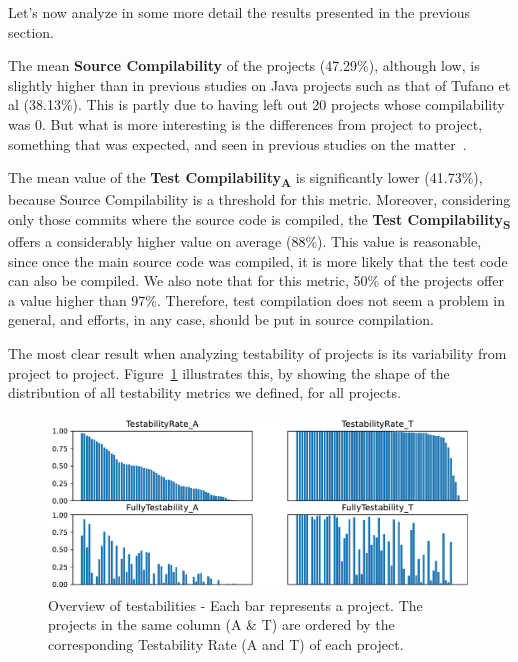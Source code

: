 Let's now analyze in some more detail the results presented in the previous section.

The mean \textbf{Source Compilability} of the projects (47.29\%), although low, is slightly higher than in previous studies on Java projects such as that of Tufano et al (38.13\%). 
This is partly due to having left out 20 projects whose compilability was 0.
But what is more interesting is the differences from project to project, something that was expected, and seen in previous studies on the matter~\cite{tufano2017there,sulir2020large,querel:2021:warning}.

The mean value of the \textbf{Test Compilability\textsubscript{A}} is significantly lower (41.73\%), because Source Compilability is a threshold for this metric.
Moreover, considering only those commits where the source code is compiled, the \textbf{Test Compilability\textsubscript{S}} offers a considerably higher value on average (88\%).
This value is reasonable, since once the main source code was compiled, it is more likely that the test code can also be compiled. 
We also note that for this metric, 50\% of the projects offer a value higher than 97\%.
Therefore, test compilation does not seem a problem in general, and efforts, in any case, should be put in source compilation.



The most clear result when analyzing testability of projects is its variability from project to project. 
Figure~\ref{fig:testability-overview} illustrates this, by showing the shape of the distribution of all testability metrics we defined, for all projects.

\begin{figure}[ht!]
    \centering    
    \includegraphics[width=\textwidth]{pages/02-Testability/images/Overview.pdf}
    \caption{Overview of testabilities - Each bar represents a project. The projects in the same column (A \& T) are ordered by the corresponding Testability Rate (A and T) of each project.}
    \label{fig:testability-overview}
\end{figure}

